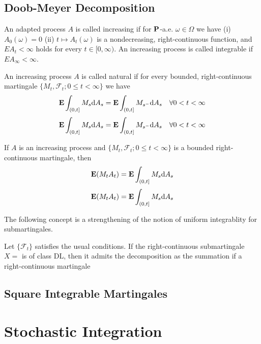 \subsection{Doob-Meyer Decomposition}
\begin{definition}
    An adapted process $A$ is called increasing if for $\mathbf{P}$-a.e. $\omega\in\Omega$ we have \newline 
    (i) $A_0(\omega)=0$\newline 
    (ii) $t\mapsto A_t(\omega)$ is a nondecreasing, right-continuous function, and $EA_t<\infty$ holds for every $t\in [0,\infty)$.\newline 
    An increasing process is called integrable if $EA_\infty<\infty$.
\end{definition}
\begin{definition}
    An increasing process $A$ is called natural if for every bounded, right-continuous martingale $\{M_t,\mathcal{F}_t;0\leq t<\infty\}$ we have
    \[ \mathbf{E}\int_{(0,t]}M_s\mathrm{d}A_s=\mathbf{E}\int_{(0,t]}M_{s^-}\mathrm{d}A_s\quad\forall 0<t<\infty\]
    \[ \mathbf{E}\int_{(0,t]}M_s\mathrm{d}A_s=\mathbf{E}\int_{(0,t]}M_{s^-}\mathrm{d}A_s\quad\forall 0<t<\infty\]
\end{definition}
\begin{lemma}
    If $A$ is an increasing process and $\{M_t,\mathcal{F}_t;0\leq t<\infty\}$ is a bounded right-continuous martingale, then 
    \[ \mathbf{E}(M_tA_t)=\mathbf{E}\int_{(0,t]}M_s\mathrm{d}A_s \]
    \[ \mathbf{E}(M_tA_t)=\mathbf{E}\int_{(0,t]}M_s\mathrm{d}A_s \]
\end{lemma}
The following concept is a strengthening of the notion of uniform integrablity for submartingales.
\begin{definition}[class DL]
    
\end{definition}
\begin{theorem}
    Let $\{\mathcal{F}_t\}$ satisfies the usual conditions. If the right-continuous submartingale $X=$ is of class DL,
    then it admits the decomposition as the summation if a right-continuous martingale
\end{theorem}

\subsection{Square Integrable Martingales}





\section{Stochastic Integration}
